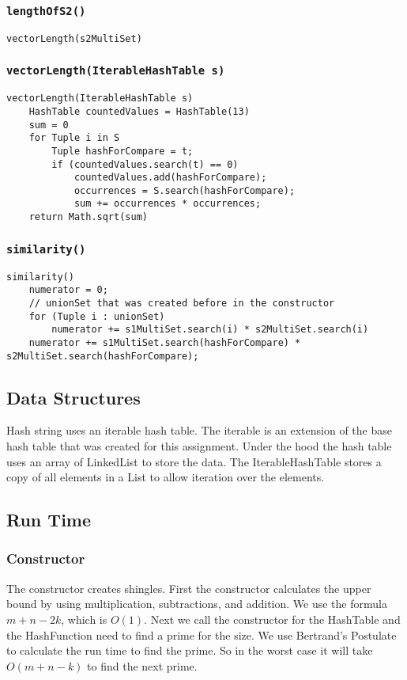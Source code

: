 \documentclass[10pt,letterpaper]{article}
\begin{document}
\subsubsection{\texttt{lengthOfS2()}}
\begin{verbatim}
vectorLength(s2MultiSet)
\end{verbatim}
\subsubsection{\texttt{vectorLength(IterableHashTable s)}}
\begin{verbatim}
vectorLength(IterableHashTable s)
    HashTable countedValues = HashTable(13)
    sum = 0
    for Tuple i in S
        Tuple hashForCompare = t;
        if (countedValues.search(t) == 0)
            countedValues.add(hashForCompare);
            occurrences = S.search(hashForCompare);
            sum += occurrences * occurrences;
    return Math.sqrt(sum)
\end{verbatim}
\subsubsection{\texttt{similarity()}}
\begin{verbatim}
similarity()
    numerator = 0;
    // unionSet that was created before in the constructor
    for (Tuple i : unionSet)
        numerator += s1MultiSet.search(i) * s2MultiSet.search(i)
    numerator += s1MultiSet.search(hashForCompare) * s2MultiSet.search(hashForCompare);
\end{verbatim}
\subsection{Data Structures}
Hash string uses an iterable hash table. The iterable is an extension of the base hash table that was created for this
assignment. Under the hood the hash table uses an array of LinkedList to store the data. The IterableHashTable stores
a copy of all elements in a List to allow iteration over the elements.
\subsection{Run Time}
\subsubsection{Constructor}
The constructor creates shingles. First the constructor calculates the upper bound by using multiplication, subtractions, and addition. We use the formula $m+n-2k$, which is $O(1)$.
Next we call the constructor for the HashTable and the HashFunction need to find a prime for the size. We use Bertrand's Postulate to calculate the run time to find the prime. So in the worst case it will take $O(m+n-k)$ to find the next prime.
\end{document}
